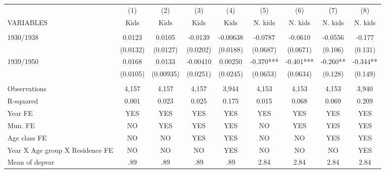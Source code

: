 \begin{tabular}{lcccccccc} \hline
 & (1) & (2) & (3) & (4) & (5) & (6) & (7) & (8) \\
VARIABLES & Kids & Kids & Kids & Kids & N. kids & N. kids & N. kids & N. kids \\ \hline
 &  &  &  &  &  &  &  &  \\
1930/1938 & 0.0123 & 0.0105 & -0.0139 & -0.00638 & -0.0787 & -0.0610 & -0.0556 & -0.177 \\
 & (0.0132) & (0.0127) & (0.0202) & (0.0188) & (0.0687) & (0.0671) & (0.106) & (0.131) \\
1939/1950 & 0.0168 & 0.0133 & -0.00410 & 0.00250 & -0.370*** & -0.401*** & -0.260** & -0.344** \\
 & (0.0105) & (0.00935) & (0.0251) & (0.0245) & (0.0653) & (0.0634) & (0.128) & (0.149) \\
 &  &  &  &  &  &  &  &  \\
Observations & 4,157 & 4,157 & 4,157 & 3,944 & 4,153 & 4,153 & 4,153 & 3,940 \\
R-squared & 0.001 & 0.023 & 0.025 & 0.175 & 0.015 & 0.068 & 0.069 & 0.209 \\
Year FE & YES & YES & YES & YES & YES & YES & YES & YES \\
Mun. FE & NO & YES & YES & YES & NO & YES & YES & YES \\
Age class FE & NO & NO & YES & YES & NO & NO & YES & YES \\
Year X Age group X Residence FE & NO & NO & NO & YES & NO & NO & NO & YES \\
 Mean of depvar & .89 & .89 & .89 & .89 & 2.84 & 2.84 & 2.84 & 2.84 \\ \hline
\end{tabular}
